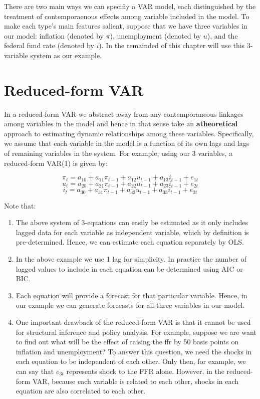 \documentclass[]{book}
\theoremstyle{definition}
\theoremstyle{definition}
\theoremstyle{definition}
\theoremstyle{remark}
\begin{document}
There are two main ways we can specifiy a VAR model, each distinguished by the treatment of contemporaenous effects among variable included in the model. To make each type's main features salient, suppose that we have three variables in our model: inflation (denoted by \(\pi\)), unemployment (denoted by \(u\)), and the federal fund rate (denoted by \(i\)). In the remainded of this chapter will use this 3-variable system as our example.

\hypertarget{reduced-form-var}{%
\section{Reduced-form VAR}\label{reduced-form-var}}

In a reduced-form VAR we abstract away from any contemporaneous linkages among variables in the model and hence in that sense take an \textbf{atheoretical} approach to estimating dynamic relationships among these variables. Specifically, we assume that each variable in the model is a function of its own lags and lags of remaining variables in the system. For example, using our 3 variables, a reduced-form VAR(1) is given by:

\[\pi_t = a_{10} + a_{11} \pi_{t-1} + a_{12} u_{t-1} + a_{13} i_{t-1} + e_{1t}\]
\[u_t = a_{20} + a_{21} \pi_{t-1} + a_{22} u_{t-1} + a_{23} i_{t-1} + e_{2t}\]
\[i_t = a_{30} + a_{31} \pi_{t-1} + a_{32} u_{t-1} + a_{33} i_{t-1} + e_{3t}\]

Note that:

\begin{enumerate}
\def\labelenumi{\alph{enumi}.}
\item
  The above system of 3-equations can easily be estimated as it only includes lagged data for each variable as independent variable, which by definition is pre-determined. Hence, we can estimate each equation separately by OLS.
\item
  In the above example we use 1 lag for simplicity. In practice the number of lagged values to include in each equation can be determined using AIC or BIC.
\item
  Each equation will provide a forecast for that particular variable. Hence, in our example we can generate forecasts for all three variables in our model.
\item
  One important drawback of the reduced-form VAR is that it cannot be used for structural inference and policy analysis. For example, suppose we are want to find out what will be the effect of raising the ffr by 50 basis points on inflation and unemployment? To answer this question, we need the shocks in each equation to be independent of each other. Only then, for example, we can say that \(e_{3t}\) represents shock to the FFR alone. However, in the reduced-form VAR, because each variable is related to each other, shocks in each equation are also correlated to each other.
\end{enumerate}
\end{document}
